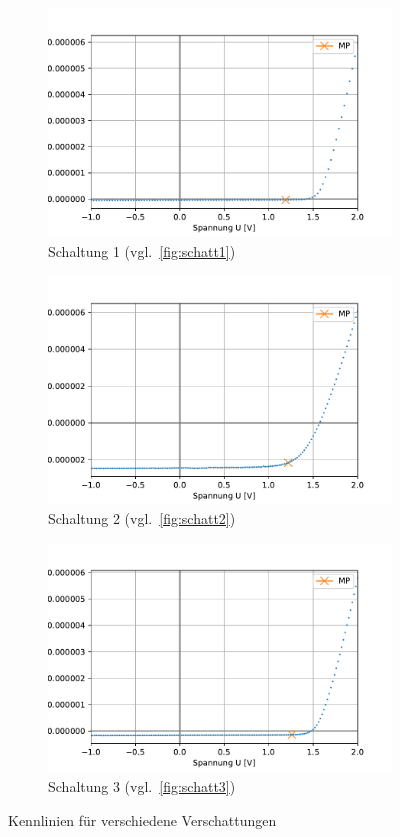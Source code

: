 \documentclass[slug=SZ, room=Hermann-Krone-Bau\,\ Labor\ 1.25, supervisor=Martin\ Kroll]{../../Lab_Report_LaTeX/lab_report}
\begin{document}
\begin{figure}[H]\centering
        \begin{subfigure}[b]{1\textwidth}\centering
                \includegraphics[width=.5\columnwidth]{figs/python/C/3x3_verschattung_1.pdf}
                \caption{Schaltung 1 (vgl.~\ref{fig:schatt1})}
                \label{diag:verschattung1}
        \end{subfigure}
        \begin{subfigure}[b]{1\textwidth}\centering
                \includegraphics[width=.5\columnwidth]{figs/python/C/3x3_verschattung_2.pdf}
                \caption{Schaltung 2 (vgl.~\ref{fig:schatt2})}
                \label{diag:verschattung2}
        \end{subfigure}
        \begin{subfigure}[b]{1\textwidth}\centering
                \includegraphics[width=.5\columnwidth]{figs/python/C/3x3_verschattung_3.pdf}
                \caption{Schaltung 3 (vgl.~\ref{fig:schatt3})}
                \label{diag:verschattung3}
        \end{subfigure}
        \caption{Kennlinien für verschiedene Verschattungen}
        \label{fig:verschattung}
\end{figure}
\end{document}
